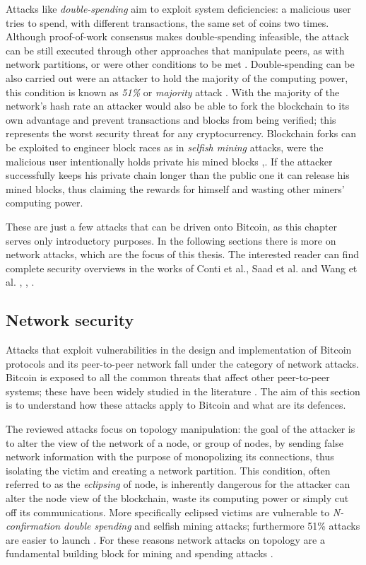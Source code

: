 \documentclass[12pt, letterpaper, twoside]{article}
\begin{document}
Attacks like \textit{double-spending} aim to exploit system deficiencies: a malicious user tries to spend, with different transactions, the same set of coins two times. Although proof-of-work consensus makes double-spending infeasible, the attack can be still executed through other approaches that manipulate peers, as with network partitions, or were other conditions to be met \cite{doublespendfastpay}. Double-spending can be also carried out were an attacker to hold the majority of the computing power, this condition is known as \textit{51\%} or \textit{majority} attack \cite{51atk}. With the majority of the network's hash rate an attacker would also be able to fork the blockchain to its own advantage and prevent transactions and blocks from being verified; this represents the worst security threat for any cryptocurrency. Blockchain forks can be exploited to engineer block races as in \textit{selfish mining} attacks, were the malicious user intentionally holds private his mined blocks \cite{selfishmining},\cite{leelavimolsilp2018selfish}. If the attacker successfully keeps his private chain longer than the public one it can release his mined blocks, thus claiming the rewards for himself and wasting other miners' computing power.

These are just a few attacks that can be driven onto Bitcoin, as this chapter serves only introductory purposes. In the following sections there is more on network attacks, which are the focus of this thesis. The interested reader can find complete security overviews in the works of Conti et al., Saad et al. and Wang et al. \cite{completeattacksurvey}, \cite{saad2019attacksurface}, \cite{secpermissionlessblock}.

\subsection{Network security}\label{netsec}
Attacks that exploit vulnerabilities in the design and implementation of Bitcoin protocols and its peer-to-peer network fall under the category of network attacks. Bitcoin is exposed to all the common threats that affect other peer-to-peer systems; these have been widely studied in the literature \cite{toucedafakeboot}. The aim of this section is to understand how these attacks apply to Bitcoin and what are its defences.

The reviewed attacks focus on topology manipulation: the goal of the attacker is to alter the view of the network of a node, or group of nodes, by sending false network information with the purpose of monopolizing its connections, thus isolating the victim and creating a network partition. This condition, often referred to as the \textit{eclipsing} of node, is inherently dangerous for the attacker can alter the node view of the blockchain, waste its computing power or simply cut off its communications.  More specifically eclipsed victims are vulnerable to \textit{N-confirmation double spending} and selfish mining attacks; furthermore 51\% attacks are easier to launch \cite{eclipseatk}. For these reasons network attacks on topology are a fundamental building block for mining and spending attacks \cite{dotan2020surveychallenges}.
\end{document}
